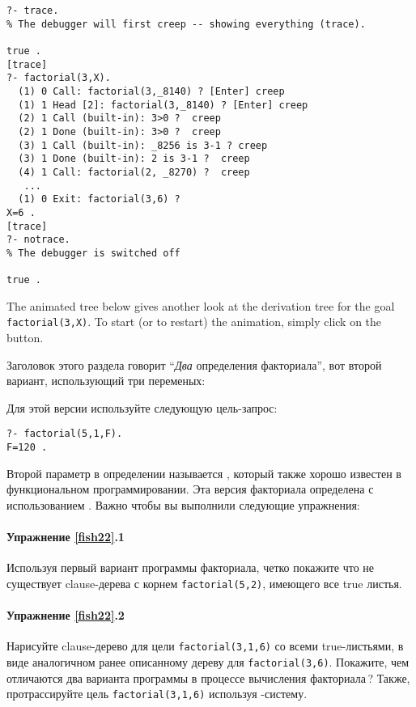 \begin{verbatim}
?- trace. 
% The debugger will first creep -- showing everything (trace). 
 
true .
[trace] 
?- factorial(3,X). 
  (1) 0 Call: factorial(3,_8140) ? [Enter] creep 
  (1) 1 Head [2]: factorial(3,_8140) ? [Enter] creep 
  (2) 1 Call (built-in): 3>0 ?  creep
  (2) 1 Done (built-in): 3>0 ?  creep
  (3) 1 Call (built-in): _8256 is 3-1 ? creep 
  (3) 1 Done (built-in): 2 is 3-1 ?  creep
  (4) 1 Call: factorial(2, _8270) ?  creep
   ... 
  (1) 0 Exit: factorial(3,6) ? 
X=6 .
[trace] 
?- notrace. 
% The debugger is switched off 
 
true .
\end{verbatim}

The animated tree below gives another look at the derivation tree for the
\prolog goal \verb'factorial(3,X)'. To start (or to restart) the animation,
simply click on the  button.

\bigskip

Заголовок этого раздела говорит ``\emph{Два} определения факториала'', вот
второй вариант, использующий три переменых:


Для этой версии используйте следующую цель-запрос:

\begin{verbatim}
?- factorial(5,1,F). 
F=120 .
\end{verbatim}

Второй параметр в определении называется , который
также хорошо известен в функциональном программировании. Эта версия факториала
определена с использованием . Важно чтобы вы выполнили
следующие упражнения:

\paragraph{Упражнение \ref{fish22}.1} Используя первый вариант программы
факториала, четко покажите что не существует clause-дерева с корнем \verb'factorial(5,2)',
имеющего все true листья.

\paragraph{Упражнение \ref{fish22}.2} Нарисуйте clause-дерево для цели
\verb'factorial(3,1,6)' со всеми true-листьями, в виде аналогичном ранее
описанному дереву для \verb'factorial(3,6)'.
Покажите, чем отличаются два варианта программы в процессе вычисления
факториала\,? Также, протрассируйте цель \verb'factorial(3,1,6)' используя
\prolog-систему.
